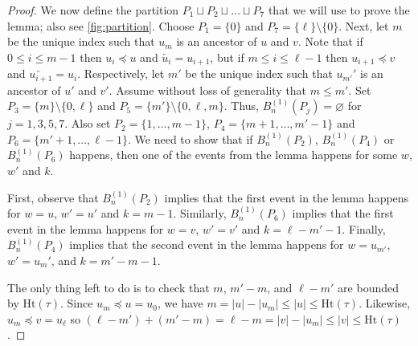 \documentclass[11pt,reqno]{amsart}
\newcommand{\1}{\mathbf{1}}
\newcommand{\0}{\mathbf{0}}
\newcommand{\Ht}{\mathrm{Ht}}
\renewcommand{\emptyset}{\varnothing}
\begin{document}
\begin{proof}
    We now define the partition $P_1 \sqcup P_2 \sqcup \dots  \sqcup P_7$ that we will use to prove the lemma; also see \cref{fig:partition}. Choose $P_1=\{0\}$ and $P_7=\{\ell\}\setminus\{0\}$. Next, let $m$ be the unique index such that $u_m$ is an ancestor of $u$ and $v$. %
    Note that if $0\leq i\leq m-1$ then $u_i\preceq u$ and $\overleftarrow{u_i}=u_{i+1}$, but if $m\leq i\leq \ell-1$ then $u_{i+1}\preceq v$ and $\overleftarrow{u_{i+1}}=u_i$. Respectively, let $m'$ be the unique index such that $u_{m'}'$ is an ancestor of $u'$ and $v'$. 
    Assume without loss of generality that $m\le m'$. Set $P_3=\{m\}\setminus\{0,\ell\}$ and $P_5=\{m'\}\setminus\{0,\ell, m\}$.  Thus, $B_n^{(1)}(P_j)=\emptyset$ for $j=1,3,5,7$. Also set $P_2=\{1,\dots, m-1\}$, $P_4=\{m+1,\dots, m'-1\}$ and $P_6=\{m'+1, \dots, \ell-1\}$. We need to show that if $B_n^{(1)}(P_2)$, $B_n^{(1)}(P_4)$ or $B_n^{(1)}(P_6)$ happens, then one of the events from the lemma happens for some $w$, $w'$ and $k$. 
    
    First, observe that $B_n^{(1)}(P_2)$ implies that the first event in the lemma happens for $w=u$, $w'=u'$ and $k=m-1$. Similarly, $B_n^{(1)}(P_6)$ implies that the first event in the lemma happens for $w=v$, $w'=v'$ and $k=\ell-m'-1$. Finally, $B_n^{(1)}(P_4)$ implies that the second event in the lemma happens for $w=u_{m'}$, $w'=u_{m}'$, and $k=m'-m-1$.
    
    The only thing left to do is to check that $m$, $m'-m$, and $\ell-m'$ are bounded by $\Ht(\tau)$. Since $u_m\preceq u=u_0$, we have $m=|u|-|u_m|\leq |u|\leq \Ht(\tau)$. Likewise, $u_m\preceq v=u_\ell$ so $(\ell-m')+(m'-m)=\ell-m=|v|-|u_m|\leq |v|\leq \Ht(\tau)$.
\end{proof}
\end{document}
